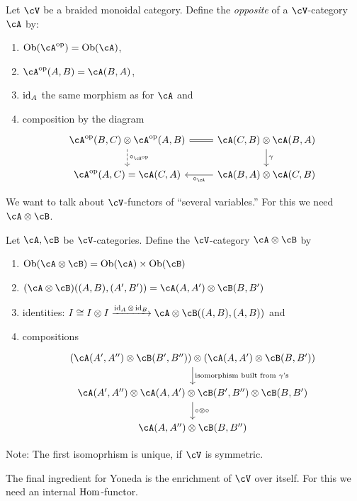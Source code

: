 \documentclass[a4paper,11pt,oneside,openany]{scrbook}
\begin{document}
\begin{defn}
	Let $ \cV $ be a braided monoidal category.
	Define the \emph{opposite} of a $ \cV $-category~$ \cA $ by:
	\begin{enumerate}[label=$\bullet$]
		\item $ \Ob(\cA^{\op}) = \Ob(\cA) $,
		\item $ \cA^{\op}(A,B) = \cA(B,A) $,
		\item $ \operatorname{id}_A $ the same morphism as for $ \cA $ and
		\item composition by the diagram
		      \begin{displaymath}
			      \begin{tikzcd}
				      \cA^{\op}(B,C)\otimes \cA^{\op}(A,B)\arrow[r, equal] \arrow[d, dashed, "\circ_{\cA^{\op}}"]& \cA(C,B)\otimes \cA(B,A) \arrow[d, "\gamma"] \\
				      \cA^{\op}(A,C) = \cA(C,A) & \cA(B,A)\otimes \cA(C,B) \arrow[l, "\circ_\cA"]
			      \end{tikzcd}
		      \end{displaymath}
	\end{enumerate}
\end{defn}
We want to talk about $ \cV $-functors of ``several variables.''
For this we need $ \cA \otimes \cB$.
\begin{defn}
	Let $ \cA,\cB $ be $ \cV $-categories.
	Define the $ \cV $-category $ \cA \otimes \cB $ by
	\begin{enumerate}[label=$ \bullet $]
		\item $ \Ob(\cA\otimes \cB) = \Ob(\cA) \times \Ob(\cB) $
		\item $ (\cA\otimes\cB)((A,B),(A',B')) = \cA(A,A')\otimes \cB(B,B') $
		\item identities: $ I \iso I\otimes I \xrightarrow{\id_A \otimes \id_B} \cA\otimes\cB((A,B),(A,B)) $ and
		\item compositions
		      \begin{displaymath}
			      \begin{tikzcd}
				      (\cA(A',A'') \otimes \cB(B',B'')) \otimes (\cA(A,A') \otimes \cB(B,B'))
				      \arrow[d, "\text{isomorphism built from $ \gamma $'s}"]
				      \\
				      \cA(A',A'') \otimes \cA(A,A')\otimes \cB(B',B'')\otimes \cB(B,B')
				      \arrow[d, "\circ\otimes\circ"]\\
				      \cA(A,A'')\otimes \cB(B,B'')
			      \end{tikzcd}
		      \end{displaymath}
	\end{enumerate}
	Note: The first isomoprhism is unique, if $ \cV $ is symmetric.
\end{defn}
The final ingredient for Yoneda is the enrichment of $ \cV $ over itself.
For this we need an internal $ \operatorname{\text{Hom}} $-functor.
\end{document}

